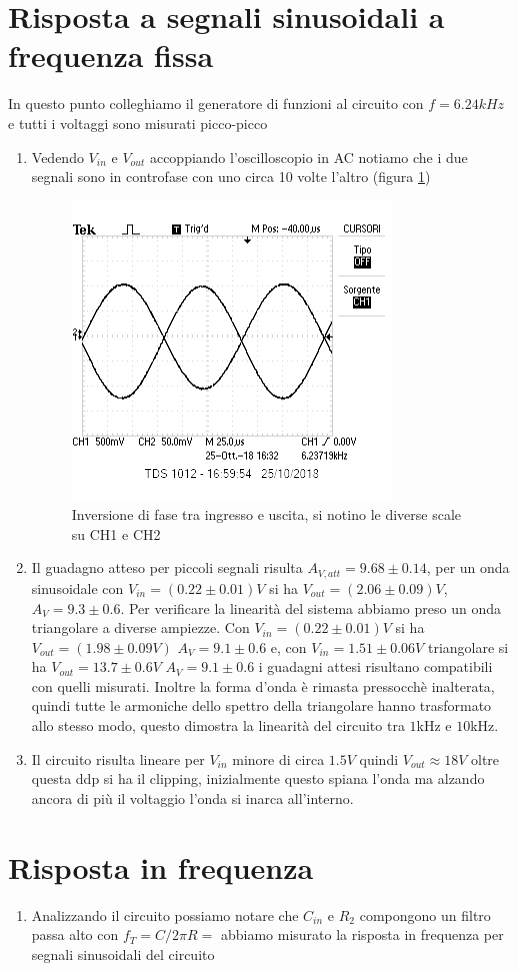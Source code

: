 \documentclass[10pt,a4paper]{article}
\begin{document}
\section{Risposta a segnali sinusoidali a frequenza fissa}
In questo punto colleghiamo il generatore di funzioni al circuito con $f=6.24kHz$ e tutti i voltaggi sono misurati picco-picco
\begin{enumerate}
\item Vedendo $V_{in}$ e $V_{out}$ accoppiando l'oscilloscopio in AC notiamo che i due segnali sono in controfase con uno circa 10 volte l'altro (figura \ref{screen})
\begin{figure}
\centering
\includegraphics[scale=1]{3_1.png}
\caption{Inversione di fase tra ingresso e uscita, si notino le diverse scale su CH1 e CH2}
\label{screen} 
\end{figure}

\item Il guadagno atteso per piccoli segnali risulta $A_{V,att}=9.68\pm0.14$, per un onda sinusoidale con $V_{in} = (0.22\pm0.01)V$ si ha $V_{out} = (2.06\pm0.09)V$, $A_V=9.3\pm0.6$. Per verificare la linearità del sistema abbiamo preso un onda triangolare a diverse ampiezze. Con $V_{in} = (0.22\pm0.01)V$ si ha $V_{out} = (1.98\pm0.09V)$ $A_V=9.1\pm0.6$ e, con $V_{in} = 1.51\pm0.06V$  triangolare si ha $V_{out} = 13.7\pm0.6V$ $A_V=9.1\pm0.6$ i guadagni attesi risultano compatibili con quelli misurati.\newline
Inoltre la forma d'onda è rimasta pressocchè inalterata, quindi tutte le armoniche dello spettro della triangolare hanno trasformato allo stesso modo, questo dimostra la linearità del circuito tra $1$kHz e $10$kHz.\newline
\item Il circuito risulta lineare per $V_{in}$ minore di circa $1.5 V$ quindi $V_{out} \approx 18 V$ oltre questa ddp si ha il clipping, inizialmente questo spiana l'onda ma alzando ancora di più il voltaggio l'onda si inarca all'interno. 
\end{enumerate}		

\section{Risposta in frequenza}
\begin{enumerate}
    \item Analizzando il circuito possiamo notare che $C_{in}$ e $R_2$ compongono un filtro passa alto con $f_T=C/2\pi R=$ abbiamo misurato la risposta in frequenza per segnali sinusoidali del circuito 
\end{enumerate}
		
\end{document}
